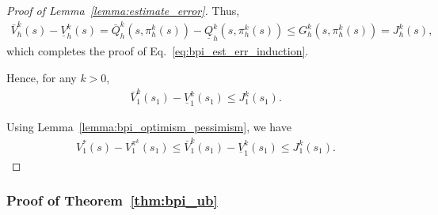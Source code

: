 \begin{proof}[Proof of Lemma~\ref{lemma:estimate_error}]
	Thus, 
	\begin{align*}
		\bar{V}^k_h(s)-\underline{V}^k_h(s)=\bar{Q}^k_h(s,\pi^k_h(s))-\underline{Q}^k_h(s,\pi^k_h(s)) \leq G^k_h(s,\pi^k_h(s)) = J^k_h(s) ,
	\end{align*}
	which completes the proof of Eq.~\eqref{eq:bpi_est_err_induction}.
	
	Hence, for any $k>0$,
	\begin{align*}
		\bar{V}^k_1(s_1)-\underline{V}^k_1(s_1) \leq J^k_1(s_1) .
	\end{align*}
	
	Using Lemma~\ref{lemma:bpi_optimism_pessimism}, we have
	\begin{align*}
		V^{*}_1(s)-V^{\pi^k}_1(s_1) \leq \bar{V}^k_1(s_1)-\underline{V}^k_1(s_1) \leq J^k_1(s_1) .
	\end{align*}
	
\end{proof}



\subsubsection{Proof of Theorem~\ref{thm:bpi_ub}}


